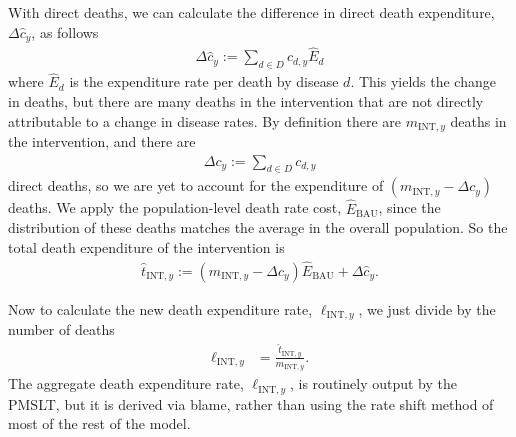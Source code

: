 \documentclass[]{article}
\begin{document}
With direct deaths, we can calculate the difference in direct death expenditure, $\Delta \widehat{c}_y$, as follows
\begin{align*}
	\Delta \widehat{c}_y := \sum_{d \in D} c_{d, y} \widehat{E}_d 
\end{align*}
where $\widehat{E}_d$ is the expenditure rate per death by disease $d$. This yields the change in deaths, but there are many deaths in the intervention that are not directly attributable to a change in disease rates. By definition there are $m_{\text{INT}, y}$ deaths in the intervention, and there are
\begin{align*}
	\Delta c_y := \sum_{d \in D} c_{d, y}
\end{align*}
direct deaths, so we are yet to account for the expenditure of $(m_{\text{INT}, y} - \Delta c_y)$ deaths. We apply the population-level death rate cost, $\widehat{E}_\text{BAU}$, since the distribution of these deaths matches the average in the overall population. So the total death expenditure of the intervention is
\begin{align*}
	\widehat{t}_{\text{INT}, y} := \left(m_{\text{INT}, y} - \Delta c_y\right)\widehat{E}_\text{BAU} + \Delta \widehat{c}_y.
\end{align*}

Now to calculate the new death expenditure rate, $\ell_{\text{INT}, y}$, we just divide by the number of deaths
\begin{align*}
	\ell_{\text{INT}, y} &= \frac{\widehat{t}_{\text{INT}, y}}{m_{\text{INT}, y}}.
\end{align*}
The aggregate death expenditure rate, $\ell_{\text{INT}, y}$, is routinely output by the PMSLT, but it is derived via blame, rather than using the rate shift method of most of the rest of the model.
\end{document}
